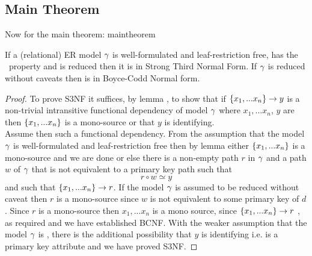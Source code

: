 \subsection{Main Theorem}
\noindent Now for the main theorem:
maintheorem
\begin{theorem}
\noindent If a (relational) ER model $\gamma$ is well-formulated and leaf-restriction free, has the \fdfactoring\ property and is reduced then it is in Strong Third Normal Form. 
If  $\gamma$ is reduced without caveats then is in Boyce-Codd Normal form.
\end{theorem}
\begin{proof}
To prove S3NF it suffices, by lemma ,  to show that if 
$\left\{x_1,...x_n\right\} \rightarrow y$ is a non-trivial intransitive functional dependency of model $\gamma$
where $x_1,...x_n$, $y$ are  
then  $\left\{x_1,...x_n\right\}$ is a mono-source or that $y$ is identifying. \\
Assume then such a functional dependency.
From the assumption that the model $\gamma$ is well-formulated and leaf-restriction free
then by lemma  
either $\left\{x_1,...x_n\right\}$ is a mono-source and we are done
or else there is a non-empty  path $r$ in $\gamma$
and a path $w$ of $\gamma$ that is not  equivalent to a primary key path such that
\begin{equation}
\label{simpleRepresentation}
 r \circ w \simeq y
\end{equation}
and such that $\left\{x_1,...x_n\right\} \rightarrow r$.
If the model $\gamma$ is assumed to be reduced without caveat then $r$ is a mono-source since $w$ is not equivalent to some primary key of $d$.
Since $r$ is a mono-source then $x_1,...x_n$ is a mono source, 
since $\left\{x_1,...x_n\right\} \rightarrow r$ , as required and we have established BCNF.
With the weaker assumption that the model $\gamma$ is , there is the additional possibility that $y$ is identifying i.e. is a primary key attribute and we have proved S3NF.
\end{proof}

